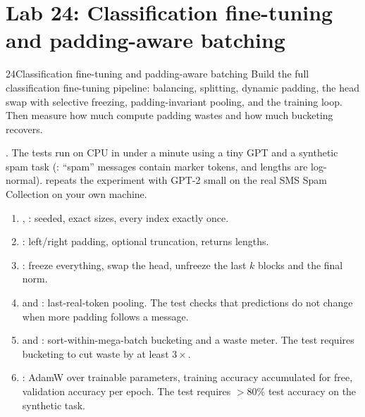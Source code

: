 \section{Lab 24: Classification fine-tuning and padding-aware batching}\label{sec:classify:lab}

\begin{labbox}{24}{Classification fine-tuning and padding-aware batching}
Build the full classification fine-tuning pipeline: balancing, splitting, dynamic
padding, the head swap with selective freezing, padding-invariant pooling, and the
training loop. Then measure how much compute padding wastes and how much bucketing
recovers.

.
The tests run on CPU in under a minute using a tiny GPT and a synthetic spam task
(: ``spam'' messages contain marker tokens, and lengths are
log-normal).  repeats the experiment with GPT-2 small on the real SMS Spam
Collection on your own machine.

\begin{enumerate}
\item {}, : seeded, exact sizes,
every index exactly once.
\item {}: left/right padding, optional truncation, returns lengths.
\item {}: freeze everything, swap the head, unfreeze the
last $k$ blocks and the final norm.
\item {} and : last-real-token
pooling. The test checks that predictions do not change when more padding follows a
message.
\item {} and : sort-within-mega-batch
bucketing and a waste meter. The test requires bucketing to cut waste by at least
$3\times$.
\item {}: AdamW over trainable parameters, training accuracy
accumulated for free, validation accuracy per epoch. The test requires $>80\%$ test
accuracy on the synthetic task.
\end{enumerate}


\end{labbox}
